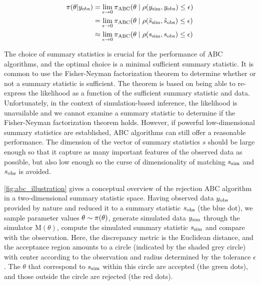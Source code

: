 \begin{equation}
\begin{aligned}
    \pi \qty(\theta | y_\mathrm{obs} ) &= \lim_{\epsilon \to 0} \pi_\mathrm{ABC} \qty(\theta \mid \rho \qty (y_\mathrm{sim}, y_\mathrm{obs}) \leq \epsilon) 
    \\
    &= \lim_{\epsilon \to 0} \pi_\mathrm{ABC} \qty(\theta \mid \rho \qty (\tilde{s}_\mathrm{sim}, \tilde{s}_\mathrm{obs}) \leq \epsilon)
    \\
    &\approx \lim_{\epsilon \to 0} \pi_\mathrm{ABC} \qty(\theta \mid \rho \qty (s_\mathrm{sim}, s_\mathrm{obs}) \leq \epsilon)
\end{aligned}
\end{equation}

The choice of summary statistics is crucial for the performance of ABC algorithms, and the optimal choice is a minimal sufficient summary statistic. It is common to use the Fisher-Neyman factorization theorem to determine whether or not a summary statistic is sufficient. The theorem is based on being able to re-express the likelihood as a function of the sufficient summary statistic and data. Unfortunately, in the context of simulation-based inference, the likelihood is unavailable and we cannot examine a summary statistic to determine if the Fisher-Neyman factorization theorem holds. However, if powerful low-dimensional summary statistics are established, ABC algorithms can still offer a reasonable performance. The dimension of the vector of summary statistics $s$ should be large enough so that it capture as many important features of the observed data as possible, but also low enough so the curse of dimensionality of matching $s_\mathrm{sim}$ and $s_\mathrm{obs}$ is avoided. 

\autoref{fig:abc_illustration} gives a conceptual overview of the rejection ABC algorithm in a two-dimensional summary statistic space. Having observed data $y_\mathrm{obs}$ provided by nature and reduced it to a summary statistic $s_\mathrm{obs}$ (the blue dot), we sample parameter values $\theta \sim \pi \qty(\theta)$, generate simulated data $y_\mathrm{sim}$ through the simulator $\mathrm{M}(\theta)$, compute the simulated summary statistic $s_\mathrm{sim}$ and compare with the observation. Here, the discrepancy metric is the Euclidean distance, and the acceptance region amounts to a circle (indicated by the shaded grey circle) with center according to the observation and radius determined by the tolerance $\epsilon$. The $\theta$ that correspond to $s_\mathrm{sim}$ within this circle are accepted (the green dots), and those outside the circle are rejected (the red dots). 

